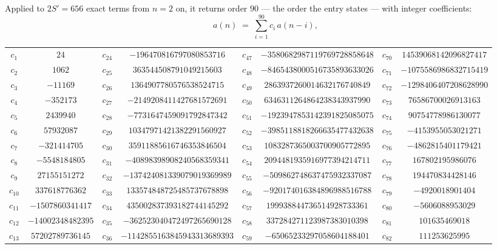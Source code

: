 \documentclass[11pt,a4paper]{article}
\theoremstyle{plain}
\theoremstyle{definition}
\begin{document}
Applied to $2S'=656$ exact terms from $n=2$ on, it returns order $90$ --- the
order the entry states --- with integer coefficients:
\[
a(n)\;=\;\sum_{i=1}^{90}c_i\,a(n-i),
\]
\begin{center}\small
\begin{tabular}{cccccccc}
$c_{1}$ & $24$ & $c_{24}$ & $-196470816797080853716$ & $c_{47}$ & $-3580682987119769728858648$ & $c_{70}$ & $14539068142096827417$ \\
$c_{2}$ & $1062$ & $c_{25}$ & $363544508791049215603$ & $c_{48}$ & $-8465438000516735893633026$ & $c_{71}$ & $-1075586986832715419$ \\
$c_{3}$ & $-11169$ & $c_{26}$ & $1364907780576538524715$ & $c_{49}$ & $2863937260014632176740849$ & $c_{72}$ & $-1298406407208628990$ \\
$c_{4}$ & $-352173$ & $c_{27}$ & $-2149208411427681572691$ & $c_{50}$ & $6346311264864238343937990$ & $c_{73}$ & $76586700026913163$ \\
$c_{5}$ & $2439940$ & $c_{28}$ & $-7731647459091792847342$ & $c_{51}$ & $-1923947853142391825085075$ & $c_{74}$ & $90754778986130077$ \\
$c_{6}$ & $57932087$ & $c_{29}$ & $10347971421382291560927$ & $c_{52}$ & $-3985118818266635477432638$ & $c_{75}$ & $-4153955053021271$ \\
$c_{7}$ & $-321414705$ & $c_{30}$ & $35911885616746353846504$ & $c_{53}$ & $1083287365003700905772895$ & $c_{76}$ & $-4862815401179421$ \\
$c_{8}$ & $-5548184805$ & $c_{31}$ & $-40898398908240568359341$ & $c_{54}$ & $2094481935916977394214711$ & $c_{77}$ & $167802195986076$ \\
$c_{9}$ & $27155151272$ & $c_{32}$ & $-137424081339079019369989$ & $c_{55}$ & $-509862748637475932337087$ & $c_{78}$ & $194470834428146$ \\
$c_{10}$ & $337618776362$ & $c_{33}$ & $133574848725485737678898$ & $c_{56}$ & $-920174016384896988516788$ & $c_{79}$ & $-4920018901404$ \\
$c_{11}$ & $-1507860341417$ & $c_{34}$ & $435002837393182744145292$ & $c_{57}$ & $199938844736514928733361$ & $c_{80}$ & $-5606088953029$ \\
$c_{12}$ & $-14002348482395$ & $c_{35}$ & $-362523040472497265690128$ & $c_{58}$ & $337284271123987383010398$ & $c_{81}$ & $101635469018$ \\
$c_{13}$ & $57202789736145$ & $c_{36}$ & $-1142855163845943313689393$ & $c_{59}$ & $-65065233297058604188401$ & $c_{82}$ & $111253625995$ \\

\end{tabular}
\end{center}
\end{document}

